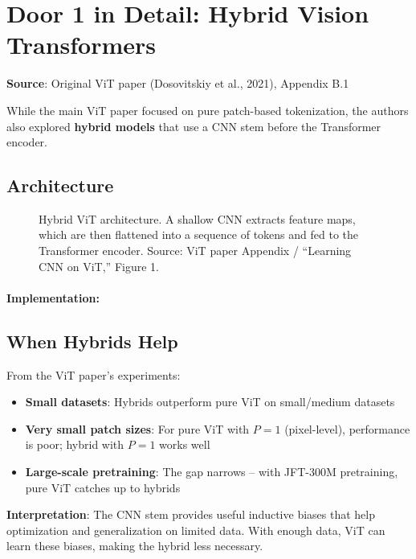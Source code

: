 \documentclass{article}
\begin{document}
\section{Door 1 in Detail: Hybrid Vision Transformers}

\textbf{Source}: Original ViT paper (Dosovitskiy et al., 2021), Appendix B.1

While the main ViT paper focused on pure patch-based tokenization, the authors also explored \textbf{hybrid models} that use a CNN stem before the Transformer encoder.

\subsection{Architecture}

\begin{figure}[h]
\centering
{}
\caption{Hybrid ViT architecture. A shallow CNN extracts feature maps, which are then flattened into a sequence of tokens and fed to the Transformer encoder. Source: ViT paper Appendix / ``Learning CNN on ViT,'' Figure 1.}
\end{figure}

\paragraph{Implementation:}


\subsection{When Hybrids Help}

From the ViT paper's experiments:

\begin{itemize}
\item \textbf{Small datasets}: Hybrids outperform pure ViT on small/medium datasets
\item \textbf{Very small patch sizes}: For pure ViT with $P=1$ (pixel-level), performance is poor; hybrid with $P=1$ works well
\item \textbf{Large-scale pretraining}: The gap narrows -- with JFT-300M pretraining, pure ViT catches up to hybrids
\end{itemize}

\textbf{Interpretation}: The CNN stem provides useful inductive biases that help optimization and generalization on limited data. With enough data, ViT can learn these biases, making the hybrid less necessary.
\end{document}

